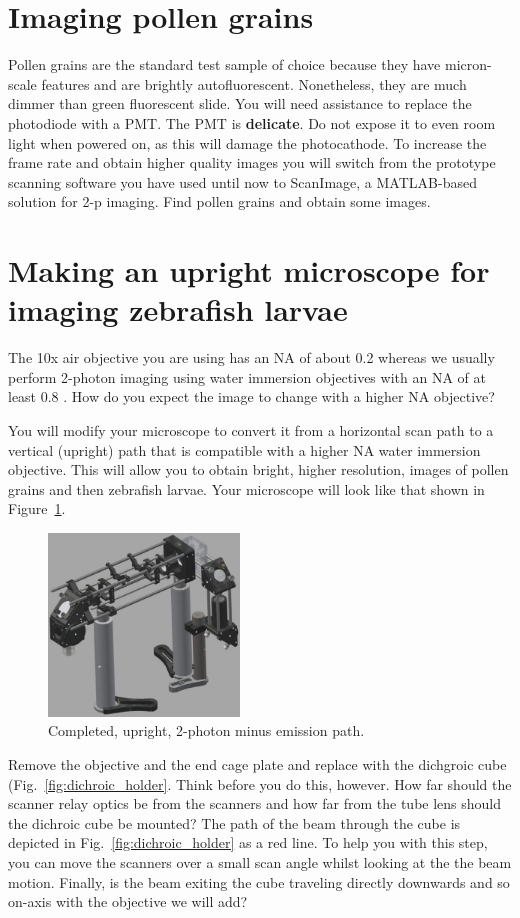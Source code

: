 \documentclass[a4paper]{report}
\begin{document}
\section{Imaging pollen grains}
Pollen grains are the standard test sample of choice because they have micron-scale features and are brightly autofluorescent. 
Nonetheless, they are much dimmer than green fluorescent slide.
You will need assistance to replace the photodiode with a PMT.
The PMT is \textbf{delicate}. 
Do not expose it to even room light when powered on, as this will damage the photocathode. 
To increase the frame rate and obtain higher quality images you will switch from the prototype scanning software you have used until now to ScanImage, a MATLAB-based solution for 2-p imaging. 
Find pollen grains and obtain some images. 

\section{Making an upright microscope for imaging zebrafish larvae}
The 10x air objective you are using has an NA of about 0.2 whereas we usually perform 2-photon imaging using water immersion objectives with an NA of at least 0.8 .
How do you expect the image to change with a higher NA objective?

You will modify your microscope to convert it from a horizontal scan path to a vertical (upright) path that is compatible with a higher NA water immersion objective. 
This will allow you to obtain bright, higher resolution, images of pollen grains and then zebrafish larvae. 
Your microscope will look like that shown in Figure~\ref{fig:completed}.

\begin{figure}[h]
\center
\includegraphics[width=2.0in]{./figures/completed_2p.eps}
\caption{Completed, upright, 2-photon minus emission path.}
\label{fig:completed}
\end{figure}

Remove the  objective and the end cage plate and replace with the dichgroic cube (Fig.~\ref{fig:dichroic_holder}.
Think before you do this, however. 
How far should the scanner relay optics be from the scanners and how far from the tube lens should the dichroic cube be mounted?
The path of the beam through the cube is depicted in Fig.~\ref{fig:dichroic_holder} as a red line.
To help you with this step, you can move the scanners over a small scan angle whilst looking at the the beam motion. 
Finally, is the beam exiting the cube traveling directly downwards and so on-axis with the objective we will add?
\end{document}
